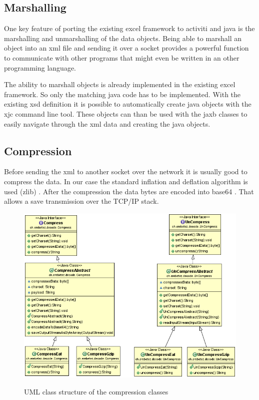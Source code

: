 \documentclass[paper=a4,twoside=false,BCOR=0mm,DIV=calc,fontsize=12pt]{scrartcl}
\begin{document}
\subsection{Marshalling}
One key feature of porting the existing excel framework to activiti and java is the marshalling and unmarshalling of the data objects.
Being able to marshall an object into an xml file and sending it over a socket provides a powerful function to communicate with other programs that
might even be written in an other programming language.

The ability to marshall objects is already implemented in the existing excel framework. So only the matching java code has to be implemented.
With the existing xsd definition it is possible to automatically create java objects with the xjc \cite{xjc} command line tool.
These objects can than be used with the jaxb classes to easily navigate through the xml data and creating the java objects.



\subsection{Compression}
Before sending the xml to another socket over the network it is usually good to compress the data.
In our case the standard inflation and deflation algorithm is used (zlib) \cite{zlib}. After the compression 
the data bytes are encoded into base64 \cite{base64}. That allows a save transmission over the TCP/IP stack.

\begin{figure}
    \begin{center}
      \includegraphics[width=1\textwidth]{./img/uml_decode_model.png}\\
    \end{center}
  \caption{UML class structure of the compression classes}
  \label{compressionClassUml}
\end{figure} 
\end{document}
